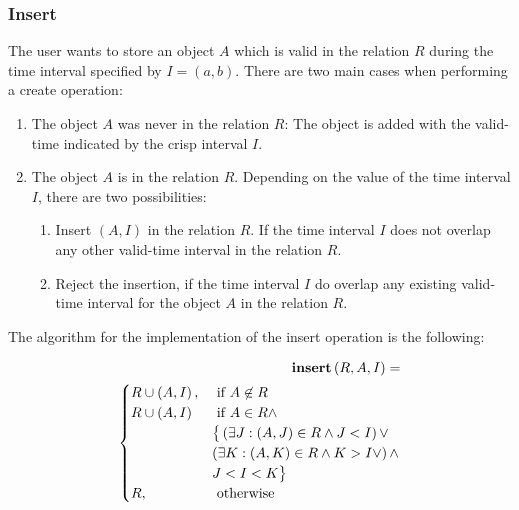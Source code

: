 \subsubsection{Insert}
The user wants to store an object $A$ which is valid in the relation $R$ during the time interval specified by $I = \left(a, b \right)$.
%
%
There are two main cases when performing a create operation:
\begin{enumerate}
\item The object $A$ was never in the relation $R$: The object is added with the valid-time indicated by the crisp interval $I$.

\item The object $A$ is in the relation $R$. Depending on the value of the time interval $I$, there are two possibilities:
	\begin{enumerate}
	\item Insert $\left(A, I\right)$ in the relation $R$. If the time interval $I$ does not overlap any other valid-time interval in the relation $R$.
	\item Reject the insertion, if the time interval $I$ do overlap any existing valid-time interval for the object $A$ in the relation $R$.
	\end{enumerate}

\end{enumerate}

The algorithm for the implementation of the insert operation is the following:

\begin{align}
\label{eq:insert}
\mbox{\textbf{insert}} \left(R ,A, I\right) =\\
\begin{cases}
\nonumber
R \cup \left(A, I \right), & \mbox{ if }  A \not \in R\\
R \cup   \left(A, I \right) & \mbox{ if }  A \in R \wedge \\
& \big \lbrace \left( \exists J: \left(A, J \right) \in R \wedge J<I  \right) \vee \\
& \left( \exists K: \left(A, K \right) \in R \wedge K>I \vee \right) \wedge\\
&  J<I<K  \big \rbrace\\
R, & \mbox{ otherwise }  
\end{cases} 	
\end{align}

